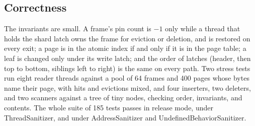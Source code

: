 \subsection{Correctness}

The invariants are small.
A frame's pin count is $-1$ only while a thread that holds the shard latch
owns the frame for eviction or deletion, and is restored on every exit; a page
is in the atomic index if and only if it is in the page table; a leaf is
changed only under its write latch; and the order of latches (header, then
top to bottom, siblings left to right) is the same on every path.
Two stress tests run eight reader threads against a pool of 64 frames and 400
pages whose bytes name their page, with hits and evictions mixed, and four
inserters, two deleters, and two scanners against a tree of tiny nodes,
checking order, invariants, and contents.
The whole suite of 185 tests passes in release mode, under ThreadSanitizer,
and under AddressSanitizer and UndefinedBehaviorSanitizer.
